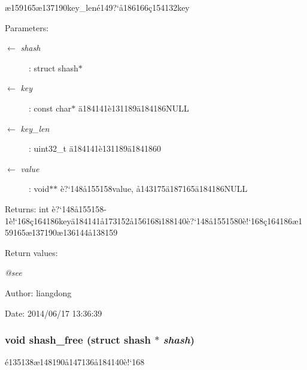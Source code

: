 \ae{}159165\ae{}137190key\_\-len\'{e}149?`\aa{}186166\c{c}154132key 

\begin{Desc}
\item[Parameters:]
\begin{description}
\item[\mbox{$\leftarrow$} {\em shash}]: struct shash$\ast$ \item[\mbox{$\leftarrow$} {\em key}]: const char$\ast$ \"{a}184141\`{e}131189\"{a}184186NULL \item[\mbox{$\leftarrow$} {\em key\_\-len}]: uint32\_\-t \"{a}184141\`{e}131189\"{a}1841860 \item[\mbox{$\leftarrow$} {\em value}]: void$\ast$$\ast$ \`{e}?`148\aa{}155158value, \aa{}143175\"{a}187165\"{a}184186NULL \end{description}
\end{Desc}
\begin{Desc}
\item[Returns:]int \`{e}?`148\aa{}155158-1\`{e}!`168\c{c}164186key\"{a}184141\aa{}173152\aa{}156168\"{\i}188140\`{e}?`148\aa{}1551580\`{e}!`168\c{c}164186\ae{}159165\ae{}137190\ae{}136144\aa{}138159 \end{Desc}
\begin{Desc}
\item[Return values:]
\begin{description}
\item[{\em @see}]\end{description}
\end{Desc}
\begin{Desc}
\item[Author:]liangdong \end{Desc}
\begin{Desc}
\item[Date:]2014/06/17 13:36:39 \end{Desc}
\subsubsection{\setlength{\rightskip}{0pt plus 5cm}void shash\_\-free (struct shash $\ast$ {\em shash})}\label{shash_8h_a3}


\'{e}135138\ae{}148190\aa{}147136\aa{}184140\`{e}!`168 

